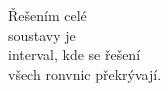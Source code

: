 \documentclass[preview]{standalone}
\begin{document}
\begin{center}
Řešením celé\\soustavy je\\interval, kde se řešení\\všech ronvnic  překrývají.
\end{center}
\end{document}
